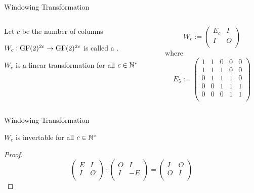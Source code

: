 \begin{frame}{Windowing Transformation}
	\begin{columns}[T]
		\begin{column}{0.45\linewidth}
			Let $c$ be the number of columns
			
			\bigskip
			
			\begin{definition}
				$W_{c} : \operatorname{GF}(2)^{2c} \rightarrow \operatorname{GF}(2)^{2c}$ is called
				a .
			\end{definition}
			
			\bigskip
			
			\begin{theorem}
				$W_{c}$ is a linear transformation for all $c \in \mathbb{N}^{*}$
			\end{theorem}
		\end{column}
		\begin{column}{0.45\linewidth}
			\[
				W_{c} := \left(
				\begin{array}{cc}
					E_{c} & I \\
					I     & O \\
				\end{array}
				\right)
			\]
			where
			\[
				E_{5} := \left(
				\begin{array}{ccccc}
					1 & 1 & 0 & 0 & 0 \\
					1 & 1 & 1 & 0 & 0 \\
					0 & 1 & 1 & 1 & 0 \\
					0 & 0 & 1 & 1 & 1 \\
					0 & 0 & 0 & 1 & 1 \\
				\end{array}
				\right)
			\]
		\end{column}
	\end{columns}
\end{frame}

\begin{frame}{Windowing Transformation}
	\begin{lemma}
		$W_{c}$ is invertable for all $c \in \mathbb{N}^{*}$
	\end{lemma}
	
	\pause
	\bigskip
	
	\begin{proof}
		\[
			\left(
			\begin{array}{cc}
				E & I \\
				I & O \\
			\end{array}
			\right)
			\cdot
			\left(
			\begin{array}{cc}
				O & I  \\
				I & -E \\
			\end{array}
			\right)
			=
			\left(
			\begin{array}{cc}
				I & O \\
				O & I \\
			\end{array}			
			\right)
		\]
	\end{proof}
\end{frame}

